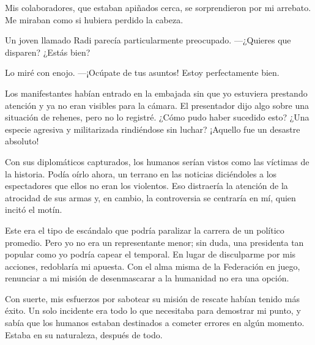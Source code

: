 Mis colaboradores, que estaban apiñados cerca, se sorprendieron por mi arrebato. Me miraban como si hubiera perdido la cabeza.

Un joven llamado Radi parecía particularmente preocupado. —¿Quieres que disparen? ¿Estás bien?

Lo miré con enojo. —¡Ocúpate de tus asuntos! Estoy perfectamente bien.

Los manifestantes habían entrado en la embajada sin que yo estuviera prestando atención y ya no eran visibles para la cámara. El presentador dijo algo sobre una situación de rehenes, pero no lo registré. ¿Cómo pudo haber sucedido esto? ¿Una especie agresiva y militarizada rindiéndose sin luchar? ¡Aquello fue un desastre absoluto!

Con sus diplomáticos capturados, los humanos serían vistos como las víctimas de la historia. Podía oírlo ahora, un terrano en las noticias diciéndoles a los espectadores que ellos no eran los violentos. Eso distraería la atención de la atrocidad de sus armas y, en cambio, la controversia se centraría en mí, quien incitó el motín.

Este era el tipo de escándalo que podría paralizar la carrera de un político promedio. Pero yo no era un representante menor; sin duda, una presidenta tan popular como yo podría capear el temporal. En lugar de disculparme por mis acciones, redoblaría mi apuesta. Con el alma misma de la Federación en juego, renunciar a mi misión de desenmascarar a la humanidad no era una opción.

Con suerte, mis esfuerzos por sabotear su misión de rescate habían tenido más éxito. Un solo incidente era todo lo que necesitaba para demostrar mi punto, y sabía que los humanos estaban destinados a cometer errores en algún momento. Estaba en su naturaleza, después de todo.
